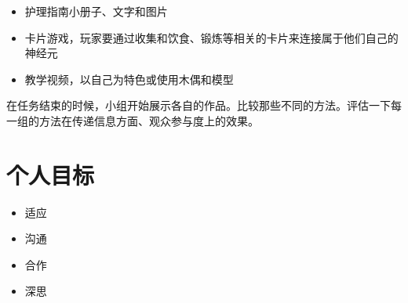     \begin{itemize}
      \item 护理指南小册子、文字和图片
      \item 卡片游戏，玩家要通过收集和饮食、锻炼等相关的卡片来连接属于他们自己的神经元
      \item 教学视频，以自己为特色或使用木偶和模型
    \end{itemize}  
    在任务结束的时候，小组开始展示各自的作品。比较那些不同的方法。评估一下每一组的方法在传递信息方面、观众参与度上的效果。

\section{个人目标}
    \begin{itemize}
      \item 适应
      \item 沟通
      \item 合作
      \item 深思   
    \end{itemize}  
